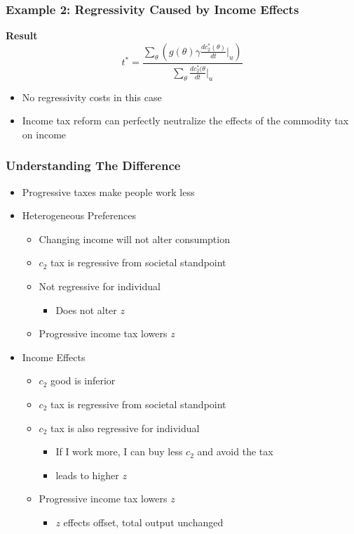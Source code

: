 \documentclass{beamer}
\begin{document}
\begin{frame}
\frametitle{Example 2: Regressivity Caused by Income Effects }

\textbf{Result}
$$
t^* =  \frac{\sum_{\theta}^{} \left( g(\theta)\gamma\frac{dc_2^*(\theta)}{dt} \biggr\rvert_{u} \right)}{\sum_{\theta}\frac{dc_2^*(\theta}{dt} \biggr\rvert_{u}}
$$

\begin{itemize}

\item No regressivity costs in this case
\item  Income tax reform can perfectly neutralize the effects of the commodity tax on income

\end{itemize}
\end{frame}

\begin{frame}
\frametitle{Understanding The Difference}

\begin{itemize}
	\item Progressive taxes make people work less
	\item Heterogeneous Preferences 
	\begin{itemize}
		\item Changing income will not alter consumption 
		\item $c_2$ tax is regressive from societal standpoint 
		\item Not regressive for individual
		\begin{itemize}
			\item Does not alter $z$
		\end{itemize} 
		\item Progressive income tax lowers $z$
	\end{itemize}
	\item Income Effects 
	\begin{itemize}
		\item $c_2$ good is inferior
		\item $c_2$ tax is regressive from societal standpoint 
		\item $c_2$ tax is also regressive for individual
		\begin{itemize}
			\item If I work more, I can buy less $c_2$ and avoid the tax 
			\item leads to higher $z$
		\end{itemize}
	
		\item Progressive income tax lowers $z$
		\begin{itemize}
			\item $z$ effects offset, total output unchanged 
		\end{itemize}
	\end{itemize}

\end{itemize}


\end{frame}
\end{document}
